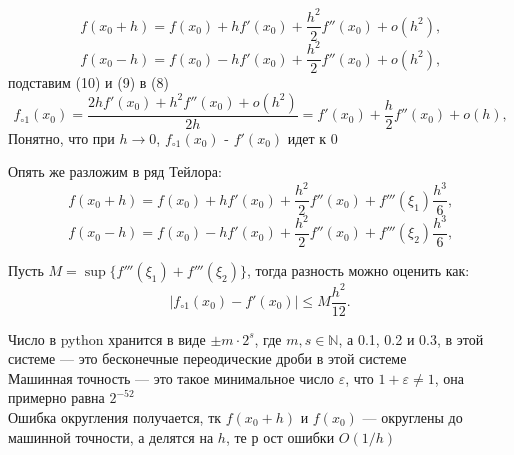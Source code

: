 \documentclass{report}
\begin{document}
\begin{equation}
  f(x_0+h)=f(x_0)+hf'(x_0)+\dfrac{h^2}{2}f''(x_0)+o(h^2)\text{,}
\end{equation}
\begin{equation}
f(x_0-h)=f(x_0)-hf'(x_0)+\dfrac{h^2}{2}f''(x_0)+o(h^2)\text{,}
\end{equation}
подставим (10) и (9) в (8)
\begin{equation}
  f_{\circ 1}(x_0)=\dfrac{2hf'(x_0)+h^2f''(x_0)+o(h^2)}{2h}=f'(x_0)+\dfrac{h}{2}f''(x_0)+o(h)\text{,}
\end{equation}
Понятно, что при $h \to 0$, $f_{\circ 1}(x_0)$ - $f'(x_0)$ идет к 0

Опять же разложим в ряд Тейлора:
\begin{equation}
  f(x_0+h)=f(x_0)+hf'(x_0)+\dfrac{h^2}{2}f''(x_0)+f'''(\xi_1)\dfrac{h^3}{6}\text{,}
\end{equation}
\begin{equation}
  f(x_0-h)=f(x_0)-hf'(x_0)+\dfrac{h^2}{2}f''(x_0)+f'''(\xi_2)\dfrac{h^3}{6}\text{,}
\end{equation}

Пусть $M=\sup \{f'''(\xi_1)+ f'''(\xi_2)\}$, тогда разность можно оценить как:
\begin{equation}
  |f_{\circ 1}(x_0)-f'(x_0)|\leq M\dfrac{h^2}{12}\text{.}
\end{equation}

Число в python хранится в виде $\pm m\cdot2^s$, где $m,s \in \mathbb{N}$, а 0.1, 0.2 и 0.3, в этой системе --- это бесконечные переодические дроби в этой системе\\
Машинная точность --- это такое минимальное число $\varepsilon$, что $1+\varepsilon \neq 1$, она примерно равна $2^{-52}$\\
Ошибка округления получается, тк $f(x_0+h)$ и $f(x_0)$ --- округлены до машинной точности, а делятся на $h$, те р
ост ошибки $O(1/h)$
\end{document}
